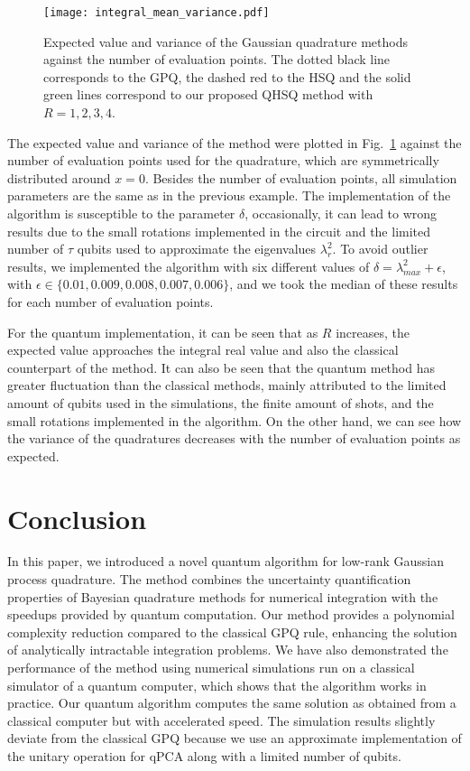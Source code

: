 \documentclass[10pt]{article}
\begin{document}
	\begin{figure}[tb!]
		\centering
		\texttt{[image: integral\_mean\_variance.pdf]}
		\caption{Expected value and variance of the Gaussian quadrature methods against the number of evaluation points. The dotted black line corresponds to the GPQ, the dashed red to the HSQ and the solid green lines correspond to our proposed QHSQ method with $R=1,2,3,4$.}
		\label{fig: mean and variance}
	\end{figure}
	The expected value and variance of the method were plotted in Fig.\ \ref{fig: mean and variance} against the number of evaluation points used for the quadrature, which are symmetrically distributed around $x = 0$. Besides the number of evaluation points, all simulation parameters are the same as in the previous example. The implementation of the algorithm is susceptible to the parameter $\delta$, occasionally, it can lead to wrong results due to the small rotations implemented in the circuit and the limited number of $\tau$ qubits used to approximate the eigenvalues $\lambda_r^2$. To avoid outlier results, we implemented the algorithm with six different values of $\delta = \lambda_{max}^2 + \epsilon$, with $\epsilon \in \{0.01, 0.009, 0.008, 0.007, 0.006\}$, and we took the median of these results for each number of evaluation points.
	
	
	For the quantum implementation, it can be seen that as $R$ increases, the expected value approaches the integral real value and also the classical counterpart of the method. It can also be seen that the quantum method has greater fluctuation than the classical methods, mainly attributed to the limited amount of qubits used in the simulations, the finite amount of shots, and the small rotations implemented in the algorithm. 
	On the other hand, we can see how the variance of the quadratures decreases with the number of evaluation points as expected. 
	
	
	\section{\label{sec: Conclusions}Conclusion}
	In this paper, we introduced a novel quantum algorithm for low-rank Gaussian process quadrature.
	The method combines the uncertainty quantification properties of Bayesian quadrature methods for numerical integration \citep{Hagan1991BHQuadrature, Minka2000QuadraturesGPR} with the speedups provided by quantum computation. 
	Our method provides a polynomial complexity reduction compared to the classical GPQ rule, enhancing the solution of analytically intractable integration problems.
	We have also demonstrated the performance of the method using numerical simulations run on a classical simulator of a quantum computer, which shows that the algorithm works in practice. Our quantum algorithm computes the same solution as obtained from a classical computer but with accelerated speed. The simulation results slightly deviate from the classical GPQ because we use an approximate implementation of the unitary operation for qPCA along with a limited number of qubits.
	
\end{document}
